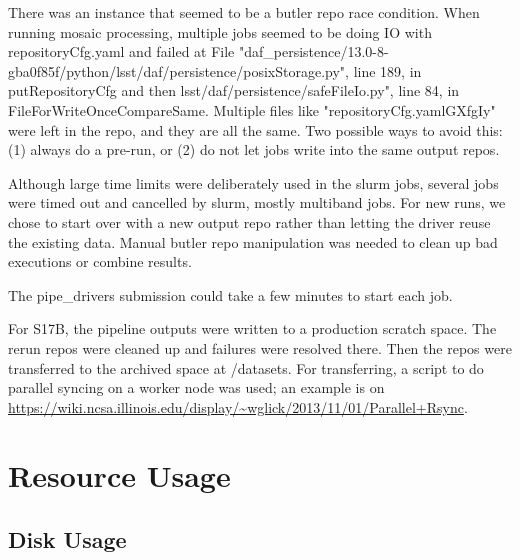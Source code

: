 \documentclass[DM,authoryear,toc]{lsstdoc}
\begin{document}
There was an instance that seemed to be a butler repo race condition. When running mosaic processing, multiple jobs seemed to be doing IO with repositoryCfg.yaml and failed at File "daf{\_}persistence/13.0-8-gba0f85f/python/lsst/daf/persistence/posixStorage.py", line 189, in putRepositoryCfg and then lsst/daf/persistence/safeFileIo.py", line 84, in FileForWriteOnceCompareSame. Multiple files like "repositoryCfg.yamlGXfgIy" were left in the repo, and they are all the same.  Two possible ways to avoid this: (1) always do a pre-run, or (2) do not let jobs write into the same output repos.

Although large time limits were deliberately used in the slurm jobs, several jobs were timed out and cancelled by slurm, mostly multiband jobs. For new runs, we chose to start over with a new output repo rather than letting the driver reuse the existing data. Manual butler repo manipulation was needed to clean up bad executions or combine results.

The pipe{\_}drivers submission could take a few minutes to start each job.

For S17B, the pipeline outputs were written to a production scratch space.  The rerun repos were cleaned up and failures were resolved there. Then the repos were transferred to the archived space at /datasets.  For transferring, a script to do parallel syncing on a worker node was used; an example is on \url{https://wiki.ncsa.illinois.edu/display/~wglick/2013/11/01/Parallel+Rsync}.


\section{Resource Usage}

\subsection{Disk Usage}
\end{document}
